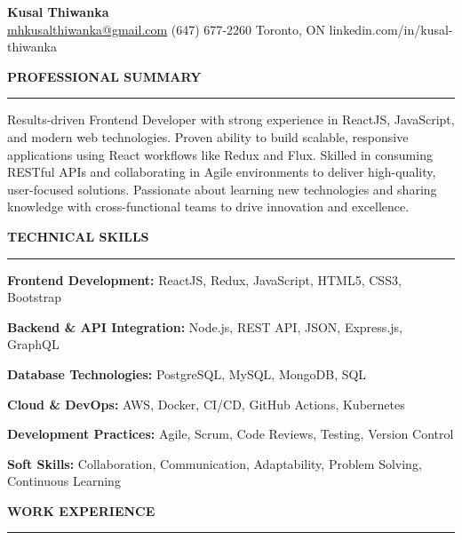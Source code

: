 \documentclass[10pt,letterpaper]{article}
\begin{document}
\begin{center}
{\LARGE\textbf{Kusal Thiwanka}}\\[3pt]
\href{mailto:mhkusalthiwanka@gmail.com}{mhkusalthiwanka@gmail.com}\hspace{2em}%
(647) 677{-}2260\hspace{2em}%
Toronto, ON\hspace{2em}
linkedin.com/in/kusal-thiwanka
\end{center}

\vspace{6pt}

\textbf{PROFESSIONAL SUMMARY}\\[-8pt]
\noindent\rule{\textwidth}{1pt}

\vspace{-2pt}

Results-driven Frontend Developer with strong experience in ReactJS, JavaScript, and modern web technologies. Proven ability to build scalable, responsive applications using React workflows like Redux and Flux. Skilled in consuming RESTful APIs and collaborating in Agile environments to deliver high-quality, user-focused solutions. Passionate about learning new technologies and sharing knowledge with cross-functional teams to drive innovation and excellence.

\vspace{8pt}

\textbf{TECHNICAL SKILLS}\\[-8pt]
\noindent\rule{\textwidth}{1pt}

\vspace{-2pt}

\textbf{Frontend Development:} ReactJS, Redux, JavaScript, HTML5, CSS3, Bootstrap

\textbf{Backend \& API Integration:} Node.js, REST API, JSON, Express.js, GraphQL

\textbf{Database Technologies:} PostgreSQL, MySQL, MongoDB, SQL

\textbf{Cloud \& DevOps:} AWS, Docker, CI/CD, GitHub Actions, Kubernetes

\textbf{Development Practices:} Agile, Scrum, Code Reviews, Testing, Version Control

\textbf{Soft Skills:} Collaboration, Communication, Adaptability, Problem Solving, Continuous Learning

\vspace{8pt}

\textbf{WORK EXPERIENCE}\\[-8pt]
\noindent\rule{\textwidth}{1pt}
\end{document}
